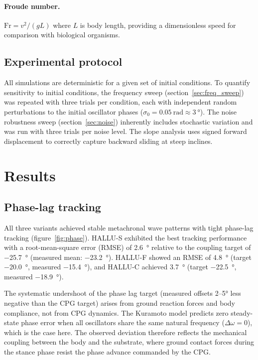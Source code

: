 \documentclass[12pt]{article}
\begin{document}
\paragraph{Froude number.}
$\text{Fr} = v^2 / (g L)$ where $L$ is body length, providing a
dimensionless speed for comparison with biological organisms.

\subsection{Experimental protocol}
\label{sec:protocol}

All simulations are deterministic for a given set of initial conditions.
To quantify sensitivity to initial conditions, the frequency sweep
(section~\ref{sec:freq_sweep}) was repeated with three trials per
condition, each with independent random perturbations to the initial
oscillator phases ($\sigma_0 = \SI{0.05}{\radian} \approx
\SI{3}{\degree}$).
The noise robustness sweep (section~\ref{sec:noise}) inherently
includes stochastic variation and was run with three trials per noise
level.
The slope analysis uses signed forward displacement to correctly
capture backward sliding at steep inclines.


\section{Results}
\label{sec:results}

\subsection{Phase-lag tracking}
\label{sec:phase_lag}

All three variants achieved stable metachronal wave patterns with
tight phase-lag tracking (figure~\ref{fig:phase}).
HALLU-S exhibited the best tracking performance with a root-mean-square
error (RMSE) of \SI{2.6}{\degree} relative to the coupling target of
\SI{-25.7}{\degree} (measured mean: \SI{-23.2}{\degree}).
HALLU-F showed an RMSE of \SI{4.8}{\degree} (target
\SI{-20.0}{\degree}, measured \SI{-15.4}{\degree}), and HALLU-C
achieved \SI{3.7}{\degree} (target \SI{-22.5}{\degree}, measured
\SI{-18.9}{\degree}).

The systematic undershoot of the phase lag target (measured offsets
2--5\si{\degree} less negative than the CPG target) arises from
ground reaction forces and body compliance, not from CPG dynamics.
The Kuramoto model predicts zero steady-state phase error when all
oscillators share the same natural frequency ($\Delta\omega = 0$),
which is the case here.
The observed deviation therefore reflects the mechanical coupling
between the body and the substrate, where ground contact forces during
the stance phase resist the phase advance commanded by the CPG.
\end{document}
